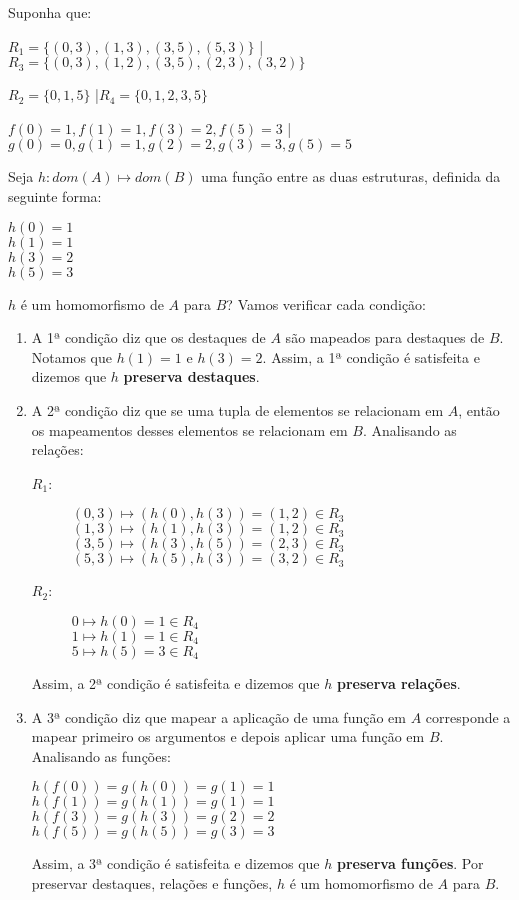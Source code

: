 Suponha que:
\begin{description}
    \item $R_1 = \{(0,3), (1,3), (3,5), (5, 3)\}$ \quad|\quad $R_3 = \{(0,3), (1,2), (3,5), (2, 3), (3,2)\}$
    \item $R_2 = \{0,1,5\}$ \quad|\quad $R_4 = \{0,1,2,3,5\}$
    \item $f(0) = 1, f(1) = 1, f(3) = 2, f(5) = 3$ \quad|\quad $g(0) = 0, g(1) = 1, g(2) = 2, g(3) = 3, g(5) = 5$
\end{description}
Seja $h: dom(A) \mapsto dom(B)$ uma função entre as duas estruturas, definida da seguinte forma:
\begin{center}
    $h(0) = 1$ \\
    $h(1) = 1$ \\
    $h(3) = 2$ \\
    $h(5) = 3$
\end{center}
$h$ é um homomorfismo de $A$ para $B$? Vamos verificar cada condição:
\begin{enumerate}
    \item A 1ª condição diz que os destaques de $A$ são mapeados para destaques de $B$. Notamos que $h(1) = 1$ e $h(3) = 2$. Assim, a 1ª condição é satisfeita e dizemos que $h$ \textbf{preserva destaques}.
    \item A 2ª condição diz que se uma tupla de elementos se relacionam em $A$, então os mapeamentos desses elementos se relacionam em $B$. Analisando as relações:
    \begin{description}
        \item[$R_1$:] $(0,3) \mapsto (h(0),h(3)) = (1,2) \in R_3$\\
        $(1,3) \mapsto (h(1),h(3)) = (1,2) \in R_3$ \\
        $(3,5) \mapsto (h(3),h(5)) = (2,3) \in R_3$ \\
        $(5,3) \mapsto (h(5),h(3)) = (3,2) \in R_3$
        \item[$R_2$:] $0 \mapsto h(0) = 1 \in R_4$ \\
        $1 \mapsto h(1) = 1 \in R_4$ \\
        $5 \mapsto h(5) = 3 \in R_4$
    \end{description}
    Assim, a 2ª condição é satisfeita e dizemos que $h$ \textbf{preserva relações}.
    \item A 3ª condição diz que mapear a aplicação de uma função em $A$ corresponde a mapear primeiro os argumentos e depois aplicar uma função em $B$. Analisando as funções:
    \begin{center}
        $h(f(0)) = g(h(0)) = g(1) = 1$ \\
        $h(f(1)) = g(h(1)) = g(1) = 1$ \\
        $h(f(3)) = g(h(3)) = g(2) = 2$ \\
        $h(f(5)) = g(h(5)) = g(3) = 3$
    \end{center}
    Assim, a 3ª condição é satisfeita e dizemos que $h$ \textbf{preserva funções}. Por preservar destaques, relações e funções, $h$ é um homomorfismo de $A$ para $B$.
     

\end{enumerate}